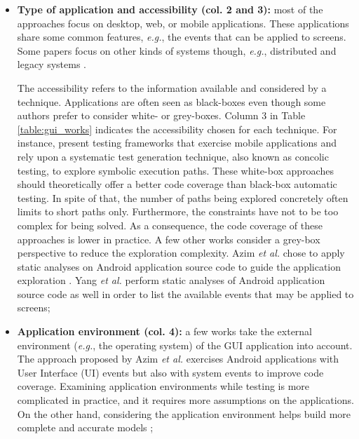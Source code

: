 \begin{itemize}
	\item \textbf{Type of application and accessibility (col.
	2 and 3):} most of the approaches focus on desktop, web, or
	mobile applications. These applications share some common
	features, \emph{e.g.}, the events that can be applied to screens.
	Some papers focus on other kinds of systems though, \emph{e.g.},
	distributed and legacy systems \cite{hungar2002}.

	The accessibility refers to the information available and
	considered by a technique. Applications are often seen as
	black-boxes even though some authors prefer to consider
	white- or grey-boxes. Column 3 in Table
	\ref{table:gui_works} indicates the accessibility chosen
	for each technique. For instance,
	\cite{concolicandroid12,5416728} present testing frameworks
	that exercise mobile applications and rely upon a
	systematic test generation technique, also known as concolic
	testing, to explore symbolic execution paths. These white-box
	approaches should theoretically offer a better code coverage
    than black-box automatic testing. In spite of that, the
    number of paths being explored concretely often limits to
    short paths only. Furthermore, the constraints have not to be
    too complex for being solved. As a consequence, the code
    coverage of these approaches is lower in practice.
	A few other works consider a grey-box perspective to reduce
	the exploration complexity. Azim \emph{et al.} chose to apply static
	analyses on Android application source code to guide the
	application exploration \cite{Azim13}. Yang \emph{et al.}
	\cite{WPX13} perform static analyses of Android application
	source code as well in order to list the available events
	that may be applied to screens;

	\item \textbf{Application environment (col. 4):} a few works
	\cite{Azim13,SP15} take the external environment (\emph{e.g.}, the
	operating system) of the GUI application into account.
	The approach proposed by Azim \emph{et al.} \cite{Azim13} exercises
	Android applications with User Interface (UI) events but also
	with system events to improve code coverage. Examining
	application environments while testing is more complicated in
	practice, and it requires more assumptions on the
    applications. On the other hand, considering the application
    environment helps build more complete and accurate models
    \cite{SP15};



\end{itemize}
